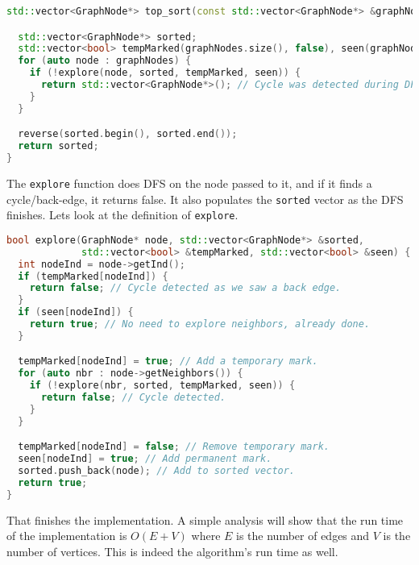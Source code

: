 \begin{lstlisting}[language=c++]
std::vector<GraphNode*> top_sort(const std::vector<GraphNode*> &graphNodes) {

  std::vector<GraphNode*> sorted;
  std::vector<bool> tempMarked(graphNodes.size(), false), seen(graphNodes.size(), false);
  for (auto node : graphNodes) {
    if (!explore(node, sorted, tempMarked, seen)) {
      return std::vector<GraphNode*>(); // Cycle was detected during DFS.
    }
  }

  reverse(sorted.begin(), sorted.end());
  return sorted;
}
\end{lstlisting}
The \verb+explore+ function does DFS on the node passed to it, and if it 
finds a cycle/back-edge, it returns false. It also populates the \verb+sorted+ 
vector as the DFS finishes. Lets look at the definition of \verb+explore+.

\begin{lstlisting}[language=c++]
bool explore(GraphNode* node, std::vector<GraphNode*> &sorted,
             std::vector<bool> &tempMarked, std::vector<bool> &seen) {
  int nodeInd = node->getInd();
  if (tempMarked[nodeInd]) {
    return false; // Cycle detected as we saw a back edge.
  }
  if (seen[nodeInd]) {
    return true; // No need to explore neighbors, already done.
  }

  tempMarked[nodeInd] = true; // Add a temporary mark.
  for (auto nbr : node->getNeighbors()) {
    if (!explore(nbr, sorted, tempMarked, seen)) {
      return false; // Cycle detected.
    }
  }

  tempMarked[nodeInd] = false; // Remove temporary mark.
  seen[nodeInd] = true; // Add permanent mark.
  sorted.push_back(node); // Add to sorted vector.
  return true;
}
\end{lstlisting}
That finishes the implementation. A simple analysis will show that the run 
time of the implementation is $O(E + V)$ where $E$ is the number of edges
and $V$ is the number of vertices. This is indeed the algorithm's run time as well. 

